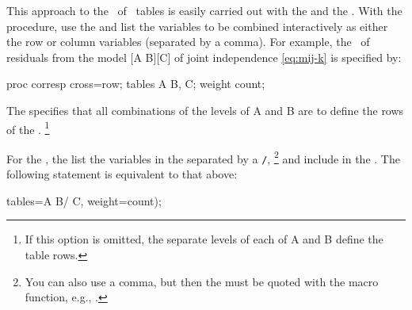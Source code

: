 This approach to the \CA\ of \mway\ tables is easily carried out with the
 and the .  With the procedure, use the
 and list the variables to be combined interactively
as either the row or column variables (separated by a comma).
For example,  the \CA\ of residuals from the model [A B][C] of joint independence
\eqref{eq:mij-k} is specified by:

\begin{listing}
proc corresp cross=row;
   tables A B, C;
   weight count;
\end{listing}
The  specifies that all combinations of the levels
of A and B are to define the rows of the \ctab.%
\footnote{If this option is omitted, the separate levels of each of
A and B define the table rows.}

For the , the
list the variables
in the  separated by a \texttt{/},%
\footnote{You can also use a comma, but then the 
must be quoted with the  macro function, e.g.,
.}
and include  in the .
The following statement is equivalent to that above:
\begin{listing}
   tables=A B/ C, weight=count);
\end{listing}

